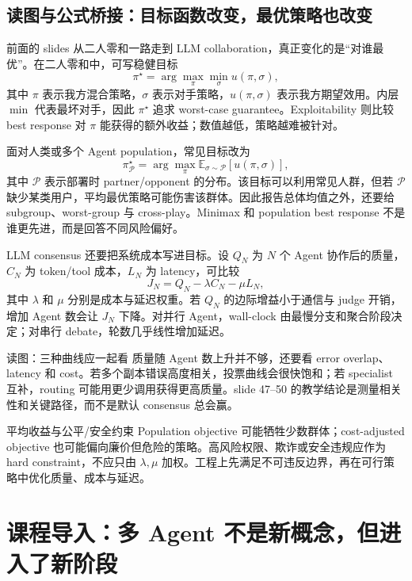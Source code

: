 \documentclass[a4paper]{article}
\begin{document}
\subsection{读图与公式桥接：目标函数改变，最优策略也改变}

前面的 slides 从二人零和一路走到 LLM collaboration，真正变化的是“对谁最优”。在二人零和中，可写稳健目标
\[
\pi^\star=\arg\max_{\pi}\min_{\sigma}u(\pi,\sigma),
\]
其中 $\pi$ 表示我方混合策略，$\sigma$ 表示对手策略，$u(\pi,\sigma)$ 表示我方期望效用。内层 $\min$ 代表最坏对手，因此 $\pi^\star$ 追求 worst-case guarantee。Exploitability 则比较 best response 对 $\pi$ 能获得的额外收益；数值越低，策略越难被针对。

面对人类或多个 Agent population，常见目标改为
\[
\pi^\star_{\mathcal P}
=\arg\max_{\pi}\mathbb E_{\sigma\sim\mathcal P}[u(\pi,\sigma)],
\]
其中 $\mathcal P$ 表示部署时 partner/opponent 的分布。该目标可以利用常见人群，但若 $\mathcal P$ 缺少某类用户，平均最优策略可能伤害该群体。因此报告总体均值之外，还要给 subgroup、worst-group 与 cross-play。Minimax 和 population best response 不是谁更先进，而是回答不同风险偏好。

LLM consensus 还要把系统成本写进目标。设 $Q_N$ 为 $N$ 个 Agent 协作后的质量，$C_N$ 为 token/tool 成本，$L_N$ 为 latency，可比较
\[
J_N=Q_N-\lambda C_N-\mu L_N,
\]
其中 $\lambda$ 和 $\mu$ 分别是成本与延迟权重。若 $Q_N$ 的边际增益小于通信与 judge 开销，增加 Agent 数会让 $J_N$ 下降。对并行 Agent，wall-clock 由最慢分支和聚合阶段决定；对串行 debate，轮数几乎线性增加延迟。

\begin{knowledgebox}{读图：三种曲线应一起看}
质量随 Agent 数上升并不够，还要看 error overlap、latency 和 cost。若多个副本错误高度相关，投票曲线会很快饱和；若 specialist 互补，routing 可能用更少调用获得更高质量。slide 47--50 的教学结论是测量相关性和关键路径，而不是默认 consensus 总会赢。
\end{knowledgebox}

\begin{warningbox}{平均收益与公平/安全约束}
Population objective 可能牺牲少数群体；cost-adjusted objective 也可能偏向廉价但危险的策略。高风险权限、欺诈或安全违规应作为 hard constraint，不应只由 $\lambda,\mu$ 加权。工程上先满足不可违反边界，再在可行策略中优化质量、成本与延迟。
\end{warningbox}

\section{课程导入：多 Agent 不是新概念，但进入了新阶段}
\end{document}
